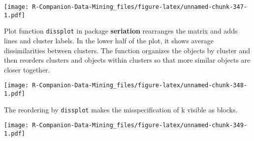 \documentclass[
  notitlepage]{book}
\newenvironment{Shaded}{\begin{snugshade}}{\end{snugshade}}
\newcommand{\DataTypeTok}[1]{\textcolor[rgb]{0.13,0.29,0.53}{#1}}
\newcommand{\DecValTok}[1]{\textcolor[rgb]{0.00,0.00,0.81}{#1}}
\newcommand{\KeywordTok}[1]{\textcolor[rgb]{0.13,0.29,0.53}{\textbf{#1}}}
\newcommand{\NormalTok}[1]{#1}
\newcommand{\OperatorTok}[1]{\textcolor[rgb]{0.81,0.36,0.00}{\textbf{#1}}}
\newcommand{\StringTok}[1]{\textcolor[rgb]{0.31,0.60,0.02}{#1}}
\begin{document}
\begin{Shaded}
\end{Shaded}

\texttt{[image: R-Companion-Data-Mining\_files/figure-latex/unnamed-chunk-347-1.pdf]}

Plot function \texttt{dissplot} in package \textbf{seriation} rearranges the matrix
and adds lines and cluster labels. In the lower half of the plot, it
shows average dissimilarities between clusters. The function organizes
the objects by cluster and then reorders clusters and objects within
clusters so that more similar objects are closer together.

\begin{Shaded}
\end{Shaded}

\texttt{[image: R-Companion-Data-Mining\_files/figure-latex/unnamed-chunk-348-1.pdf]}

The reordering by \texttt{dissplot} makes the misspecification of k visible as
blocks.

\begin{Shaded}
\end{Shaded}

\texttt{[image: R-Companion-Data-Mining\_files/figure-latex/unnamed-chunk-349-1.pdf]}

\begin{Shaded}
\end{Shaded}
\end{document}
